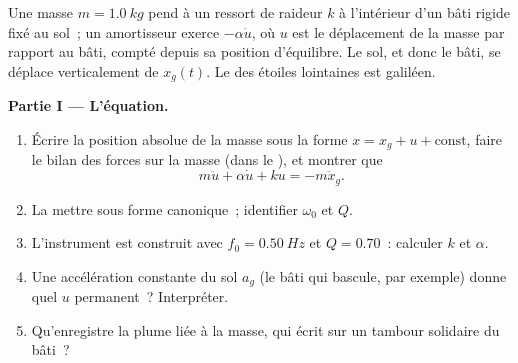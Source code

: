 \begin{problem}
\label{pb:b1:oscillators-resonance:1}
Une masse $m = \qty{1.0}{kg}$ pend à un ressort de raideur $k$ à
l'intérieur d'un bâti rigide fixé au sol~; un amortisseur exerce
$-\alpha\dot u$, où $u$ est le déplacement de la masse par rapport au
bâti, compté depuis sa position d'équilibre. Le sol, et donc le bâti, se
déplace verticalement de $x_g(t)$. Le  des étoiles lointaines
est galiléen.

\medskip
\noindent\textbf{Partie I --- L'équation.}
\begin{enumerate}
  \item Écrire la position absolue de la masse sous la forme $x = x_g + u +
        \text{const}$, faire le bilan des forces sur la masse (dans le
        ), et montrer que
        \[
        m\ddot u + \alpha\dot u + ku = -m\ddot x_g .
        \]
  \item La mettre sous forme canonique~; identifier $\omega_0$ et $Q$.
  \item L'instrument est construit avec $f_0 = \qty{0.50}{Hz}$ et $Q = 0.70$~:
        calculer $k$ et $\alpha$.
  \item Une accélération constante du sol $a_g$ (le bâti qui bascule,
        par exemple) donne quel $u$ permanent~? Interpréter.
  \item Qu'enregistre la plume liée à la masse, qui écrit sur un tambour
        solidaire du bâti~?
\end{enumerate}


\end{problem}

